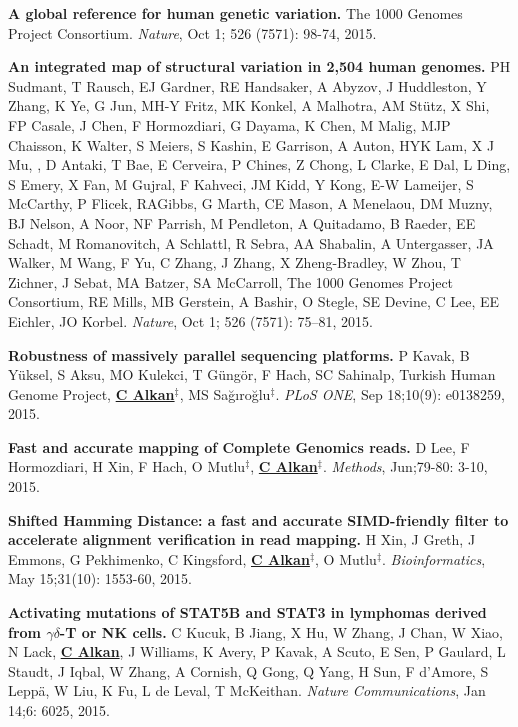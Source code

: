   \vspace{-.2cm}        
  {\bf A global reference for human genetic variation.} The 1000 Genomes Project Consortium.  {\em Nature}, Oct 1; 526 (7571): 98-74, 2015.

  \vspace{-.2cm}        
  {\bf An integrated map of structural variation in 2,504 human genomes.}
  PH Sudmant, T Rausch, EJ Gardner,  RE Handsaker, A Abyzov, J Huddleston, Y Zhang, K Ye, G Jun, MH-Y Fritz, MK Konkel, A Malhotra, AM Stütz, X Shi, FP Casale, J Chen, 
  F Hormozdiari, G Dayama, K Chen, M Malig, MJP Chaisson, K Walter, S Meiers, S Kashin, E Garrison, A Auton, HYK Lam, X J Mu, \calkan, D Antaki, T Bae, E Cerveira, P Chines, Z Chong, 
  L Clarke, E Dal, L Ding, S Emery, X Fan, M Gujral, F Kahveci, JM Kidd, Y Kong, E-W Lameijer, S McCarthy, P Flicek, RAGibbs, G Marth, CE Mason, A Menelaou, DM Muzny, 
  BJ Nelson, A Noor, NF Parrish, M Pendleton, A Quitadamo, B Raeder, EE Schadt, M Romanovitch, A Schlattl, R Sebra, AA Shabalin, A Untergasser, 
  JA Walker, M Wang, F Yu, C Zhang, J Zhang, X Zheng-Bradley, W Zhou, T Zichner, J Sebat, MA Batzer, SA McCarroll, 
  The 1000 Genomes Project Consortium, RE Mills, MB Gerstein, A Bashir, O Stegle, SE Devine, C Lee, EE Eichler, JO Korbel. 
  {\em Nature}, Oct 1; 526 (7571): 75–81, 2015.

  \vspace{-.2cm}        
  {\bf Robustness of massively parallel sequencing platforms.}
  P Kavak, B Yüksel, S Aksu, MO Kulekci, T Güngör, F Hach, SC Sahinalp, Turkish Human Genome Project, {\bf {\underline {C Alkan}}}$^\ddag$,
  MS Sağıroğlu$^\ddag$.    
  {\em PLoS ONE},  Sep 18;10(9): e0138259, 2015.  


  \vspace{-.2cm}        
  {\bf Fast and accurate mapping of Complete Genomics reads.}
  D Lee, F Hormozdiari, H Xin, F Hach, O Mutlu$^\ddag$,  {\bf {\underline {C Alkan}}}$^\ddag$.
  {\em Methods}, Jun;79-80: 3-10, 2015. 

  \vspace{-.2cm}        
  {\bf Shifted Hamming Distance: a fast and accurate SIMD-friendly filter to accelerate alignment verification in read mapping.} H Xin, J Greth, J Emmons, 
G Pekhimenko, C Kingsford, {\bf {\underline{C Alkan}}}$^\ddag$,  O Mutlu$^\ddag$. {\em Bioinformatics},  May 15;31(10): 1553-60, 2015.



  \vspace{-.2cm}        
  {\bf Activating mutations of STAT5B and STAT3 in lymphomas derived from $\gamma\delta$-T or NK cells.}
   C Kucuk, B Jiang, X Hu, W Zhang, J Chan, W Xiao, N Lack,   {\bf {\underline {C Alkan}}},  J Williams, K Avery, P Kavak, A Scuto, E Sen,  P Gaulard, L Staudt, J Iqbal,  W Zhang,  A Cornish, Q Gong, Q  Yang, H Sun, F d'Amore, S Leppä, W Liu, K Fu, L de Leval, T McKeithan.
 {\em Nature Communications}, Jan 14;6: 6025, 2015.



